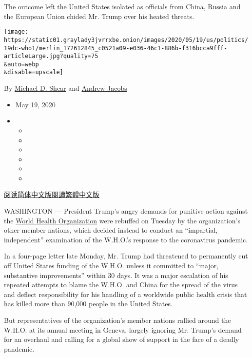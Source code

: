 The outcome left the United States isolated as officials from China,
Russia and the European Union chided Mr. Trump over his heated threats.

\texttt{[image: https://static01.graylady3jvrrxbe.onion/images/2020/05/19/us/politics/19dc-who1/merlin\_172612845\_c0521a09-e036-46c1-886b-f316bcca9fff-articleLarge.jpg?quality=75\\\&auto=webp\\\&disable=upscale]}

By \href{https://www.nytimes3xbfgragh.onion/by/michael-d-shear}{Michael
D. Shear} and
\href{https://www.nytimes3xbfgragh.onion/by/andrew-jacobs}{Andrew
Jacobs}

\begin{itemize}
\item
  May 19, 2020
\item
  \begin{itemize}
  \item
  \item
  \item
  \item
  \item
  \item
  \end{itemize}
\end{itemize}

\href{https://cn.nytimes3xbfgragh.onion/usa/20200520/trump-who-coronavirus/}{阅读简体中文版}\href{https://cn.nytimes3xbfgragh.onion/usa/20200520/trump-who-coronavirus/zh-hant/}{閱讀繁體中文版}

WASHINGTON --- President Trump's angry demands for punitive action
against the
\href{https://www.nytimes3xbfgragh.onion/2020/06/09/health/coronavirus-asymptomatic-world-health-organization.html}{World
Health Organization} were rebuffed on Tuesday by the organization's
other member nations, which decided instead to conduct an ``impartial,
independent'' examination of the W.H.O.'s response to the coronavirus
pandemic.

In a four-page letter late Monday, Mr. Trump had threatened to
permanently cut off United States funding of the W.H.O. unless it
committed to ``major, substantive improvements'' within 30 days. It was
a major escalation of his repeated attempts to blame the W.H.O. and
China for the spread of the virus and deflect responsibility for his
handling of a worldwide public health crisis that has
\href{https://www.nytimes3xbfgragh.onion/interactive/2020/us/coronavirus-us-cases.html}{killed
more than 90,000 people} in the United States.

But representatives of the organization's member nations rallied around
the W.H.O. at its annual meeting in Geneva, largely ignoring Mr. Trump's
demand for an overhaul and calling for a global show of support in the
face of a deadly pandemic.

